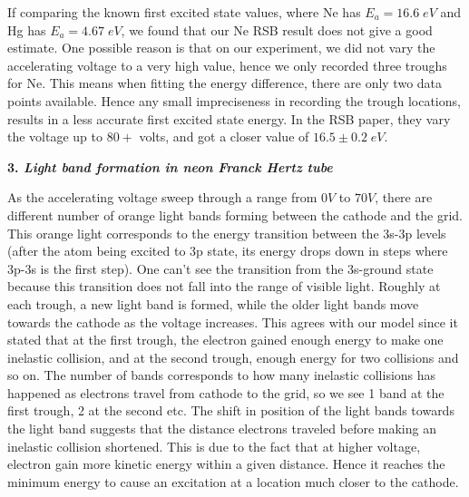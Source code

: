 \documentclass[12pt]{article}
\begin{document}
If comparing the known first excited state values, where Ne has $E_a = 16.6 \; eV$ and Hg has $E_a = 4.67 \; eV$, we found that our Ne RSB result does not give a good estimate. One possible reason is that on our experiment, we did not vary the accelerating voltage to a very high value, hence we only recorded three troughs for Ne. This means when fitting the energy difference, there are only two data points available. Hence any small impreciseness in recording the trough locations, results in a less accurate first excited state energy. In the RSB paper, they vary the voltage up to $80+$ volts, and got a closer value of $16.5\pm0.2\; eV$.
\bigskip

\textbf{3. \textit{Light band formation in neon Franck Hertz tube}}
\smallskip

As the accelerating voltage sweep through a range from $0V$ to $70V$, there are different number of orange light bands forming between the cathode and the grid. This orange light corresponds to the energy transition between the 3s-3p levels (after the atom being excited to 3p state, its energy drops down in steps where 3p-3s is the first step). One can’t see the transition from the 3s-ground state because this transition does not fall into the range of visible light. Roughly at each trough, a new light band is formed, while the older light bands move towards the cathode as the voltage increases. This agrees with our model since it stated that at the first trough, the electron gained enough energy to make one inelastic collision, and at the second trough, enough energy for two collisions and so on. The number of bands corresponds to how many inelastic collisions has happened as electrons travel from cathode to the grid, so we see 1 band at the first trough, 2 at the second etc. The shift in position of the light bands towards the light band suggests that the distance electrons traveled before making an inelastic collision shortened. This is due to the fact that at higher voltage, electron gain more kinetic energy within a given distance. Hence it reaches the minimum energy to cause an excitation at a location much closer to the cathode.
\end{document}
